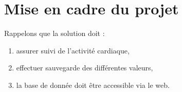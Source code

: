 \section{Mise en cadre du projet\label{cahiercharges}}
Rappelons que la solution doit :
\begin{enumerate}
  \item assurer suivi de l'activité cardiaque,
  \item effectuer sauvegarde des différentes valeurs,
  \item la base de donnée doit être accessible via le web.
\end{enumerate}